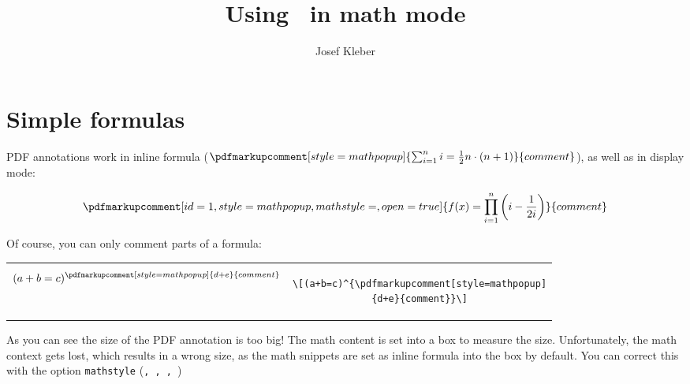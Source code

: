 \documentclass[pagesize,11pt,leqno]{scrartcl}
\begin{document}
\setlength{\parindent}{0pt}
\author{Josef Kleber}
\title{Using \texttt{\string\pdfmarkupcomment}\ in math mode}
%
\maketitle
\section{Simple formulas}
PDF annotations work in inline formula ($\pdfmarkupcomment[style=mathpopup]{\sum_{i=1}^{n}i=\frac{1}{2}n\cdot(n+1)}{comment}$), as well as in display mode:

\[\pdfmarkupcomment[id=1,style=mathpopup,mathstyle=\displaystyle,open=true]{f(x)=\prod_{i=1}^{n}\left(i-\frac{1}{2i}\right)}{comment}\]

\bigskip
Of course, you can only comment parts of a formula:

\bigskip
\begin{tabular}{cc}
\begin{minipage}{0.26\linewidth}
\[(a+b=c)^{\pdfmarkupcomment[style=mathpopup]{d+e}{comment}}\]
\end{minipage} &
\begin{minipage}{0.68\linewidth}
\begin{lstlisting}
\[(a+b=c)^{\pdfmarkupcomment[style=mathpopup]
{d+e}{comment}}\]
\end{lstlisting}
\end{minipage}
\end{tabular}

\bigskip
As you can see the size of the PDF annotation is too big! The math content is set into a box to measure the size. Unfortunately, the math context gets lost, which results in a wrong size, as the math snippets are set as inline formula into the box by default. You can correct this with the option \texttt{mathstyle} (\texttt{\string\textstyle, \string\displaystyle, \string\scriptstyle, \string\scriptscriptstyle})
\end{document}
